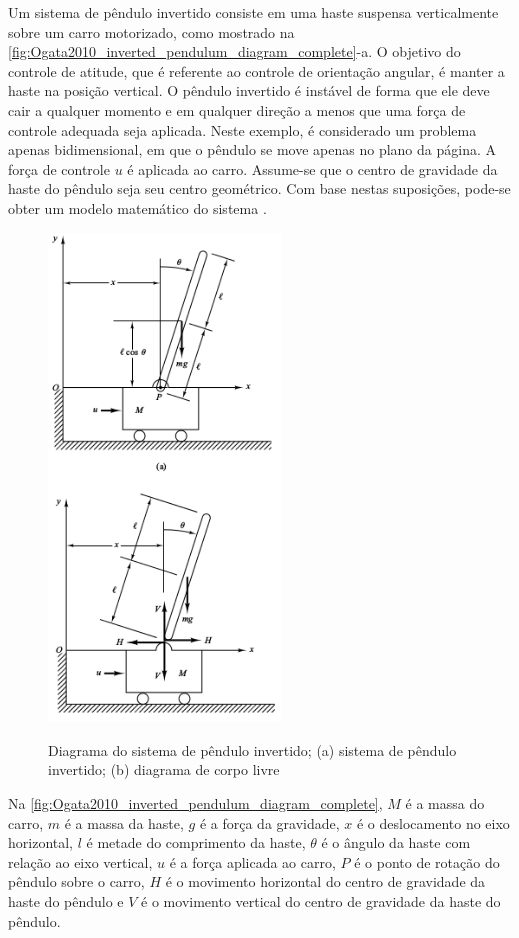 Um sistema de pêndulo invertido consiste em uma haste suspensa verticalmente sobre um carro motorizado, como mostrado na \autoref{fig:Ogata2010_inverted_pendulum_diagram_complete}-a. O objetivo do controle de atitude, que é referente ao controle de orientação angular, é manter a haste na posição vertical. O pêndulo invertido é instável de forma que ele deve cair a qualquer momento e em qualquer direção a menos que uma força de controle adequada seja aplicada. Neste exemplo, é considerado um problema apenas bidimensional, em que o pêndulo se move apenas no plano da página. A força de controle $u$ é aplicada ao carro. Assume-se que o centro de gravidade da haste do pêndulo seja seu centro geométrico. Com base nestas suposições, pode-se obter um modelo matemático do sistema \cite{Ogata2010}.

\begin{figure}[!htb]
    \centering
    \caption{Diagrama do sistema de pêndulo invertido; (a) sistema de pêndulo invertido; (b) diagrama de corpo livre}
    \includegraphics[width=0.55\textwidth]{./04-figuras/Ogata2010_inverted_pendulum_diagram_complete}
    \label{fig:Ogata2010_inverted_pendulum_diagram_complete}
\end{figure}

Na \autoref{fig:Ogata2010_inverted_pendulum_diagram_complete}, $M$ é a massa do carro, $m$ é a massa da haste, $g$ é a força da gravidade, $x$ é o deslocamento no eixo horizontal, $l$ é metade do comprimento da haste, $\theta$ é o ângulo da haste com relação ao eixo vertical, $u$ é a força aplicada ao carro, $P$ é o ponto de rotação do pêndulo sobre o carro, $H$ é o movimento horizontal do centro de gravidade da haste do pêndulo e $V$ é o movimento vertical do centro de gravidade da haste do pêndulo. 

